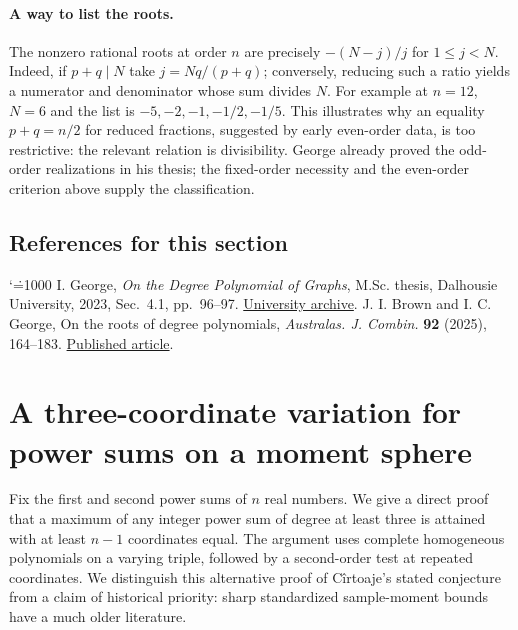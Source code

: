 \documentclass[11pt,a4paper]{article}
\makeatletter
\numberwithin{equation}{section}
\theoremstyle{definition}
\theoremstyle{remark}
\newenvironment{sectionabstract}{\par\smallskip\begingroup\small\noindent}{\par\endgroup\medskip}
\renewenvironment{thebibliography}[1]
 {\subsection*{References for this section}\small
  \list{\@biblabel{\@arabic\c@enumiv}}
       {\settowidth\labelwidth{\@biblabel{#1}}\leftmargin\labelwidth
        \advance\leftmargin\labelsep\@openbib@code
        \usecounter{enumiv}\let\p@enumiv\@empty
        \renewcommand\theenumiv{\@arabic\c@enumiv}}
  \sloppy\clubpenalty4000\widowpenalty4000\sfcode`\.=1000\relax}
 {\def\@noitemerr{\@latex@warning{Empty bibliography}}\endlist}
\makeatother
\begin{document}
\paragraph{A way to list the roots.}
The nonzero rational roots at order $n$ are precisely
$-(N-j)/j$ for $1\le j<N$. Indeed, if $p+q\mid N$ take
$j=Nq/(p+q)$; conversely, reducing such a ratio yields a numerator
and denominator whose sum divides $N$. For example at $n=12$, $N=6$
and the list is $-5,-2,-1,-1/2,-1/5$. This illustrates why an equality
$p+q=n/2$ for reduced fractions, suggested by early even-order data, is too
restrictive: the relevant relation is divisibility. George already proved
the odd-order realizations in his thesis; the fixed-order necessity and
the even-order criterion above supply the classification.

\begin{thebibliography}{9}
 I. George, \emph{On the Degree Polynomial of Graphs},
M.Sc. thesis, Dalhousie University, 2023, Sec.~4.1, pp.~96--97.
\href{https://dalspaceb.library.dal.ca/server/api/core/bitstreams/b38bd694-b1b7-4993-a49f-b0d2dc04cc0b/content}{University archive}.
 J. I. Brown and I. C. George, On the roots of degree
polynomials, \emph{Australas. J. Combin.} \textbf{92} (2025), 164--183.
\href{https://ajc.maths.uq.edu.au/pdf/92/ajc_v92_p164.pdf}{Published article}.
\end{thebibliography}

\par\endgroup

\begingroup

\section{\texorpdfstring{A three-coordinate variation for power sums on a moment sphere}{A three-coordinate variation for power sums on a moment sphere}}\label{section:r31keio}
\par\medskip


\begin{sectionabstract}
Fix the first and second power sums of $n$ real numbers. We give a direct proof that a maximum of any integer power sum of degree at least three is attained with at least $n-1$ coordinates equal. The argument uses complete homogeneous polynomials on a varying triple, followed by a second-order test at repeated coordinates. We distinguish this alternative proof of C\^irtoaje's stated conjecture from a claim of historical priority: sharp standardized sample-moment bounds have a much older literature.
\end{sectionabstract}
\end{document}
